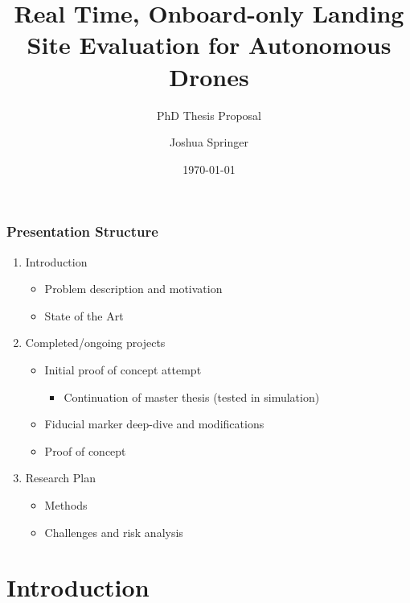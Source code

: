 \documentclass[aspectratio=169]{rubeamer}
\title[PhD Thesis Proposal]{Real Time, Onboard-only Landing Site Evaluation for Autonomous Drones}
\subtitle[demo]{PhD Thesis Proposal}
\author[Springer]{Joshua Springer}
\institute[RU]{Reykjavík University}
\date[2022]{\monthyeardate\today}%
\newif\ifpause
\newcommand{\mypause}{\ifpause \pause \fi}
\begin{document}

\begin{frame}[plain]%
  \titlepage

\end{frame}

\begin{frame}
  \frametitle{Presentation Structure}
  \begin{enumerate}
    \item Introduction
      \begin{itemize}
        \item Problem description and motivation
        \item State of the Art
      \end{itemize}
    \mypause
    \item Completed/ongoing projects
      \begin{itemize}
        \mypause
        \item Initial proof of concept attempt
          \begin{itemize}
            \item Continuation of master thesis (tested in simulation)
          \end{itemize}
        \mypause
        \item Fiducial marker deep-dive and modifications
        \mypause
        \item Proof of concept
      \end{itemize}
    \item Research Plan
      \begin{itemize}
        \item Methods
        \item Challenges and risk analysis
      \end{itemize}
  \end{enumerate}
\end{frame}

\section{Introduction}
\end{document}
